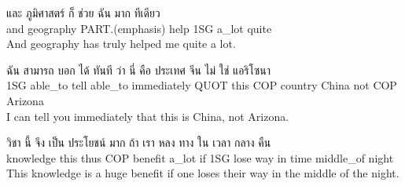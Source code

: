 \documentclass{book}
\begin{document}
	\begin{exe}
		\ex
		\gll และ ภูมิศาสตร์ ก็ ช่วย ฉัน มาก ทีเดียว\\
		and geography \textsc{PART}.(emphasis) help \textsc{1SG} a_lot quite\\
		And geography has truly helped me quite a lot.
	\end{exe}

	\begin{exe}
		\ex
		\gll ฉัน สามารถ บอก ได้ ทันที ว่า นี่ คือ ประเทศ จีน ไม่ ใช่ แอริโซนา\\
		\textsc{1SG} able_to tell able_to immediately \textsc{QUOT} this \textsc{COP} country China not \textsc{COP} Arizona\\
		I can tell you immediately that this is China, not Arizona.
	\end{exe}

	\begin{exe}
		\ex
		\gll วิชา นี้ จึง เป็น ประโยชน์ มาก ถ้า เรา หลง ทาง ใน เวลา กลาง คืน\\
		knowledge this thus \textsc{COP} benefit a_lot if \textsc{1SG} lose way in time middle_of night\\
		This knowledge is a huge benefit if one loses their way in the middle of the night.
	\end{exe}
\end{document}
